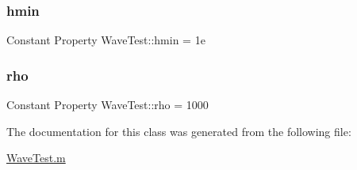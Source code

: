 \mbox{\label{class_wave_test_ac1a5b7805d5cc7ec6f62621d845ea48b}} 
\subsubsection{\texorpdfstring{hmin}{hmin}}
{\footnotesize\ttfamily Constant Property Wave\+Test\+::hmin = 1e}

\mbox{\label{class_wave_test_a01703cd871430df0750a55c9acf72015}} 
\subsubsection{\texorpdfstring{rho}{rho}}
{\footnotesize\ttfamily Constant Property Wave\+Test\+::rho = 1000}



The documentation for this class was generated from the following file\+:\begin{DoxyCompactItemize}
\item 
\hyperlink{_wave_test_8m}{Wave\+Test.\+m}\end{DoxyCompactItemize}
